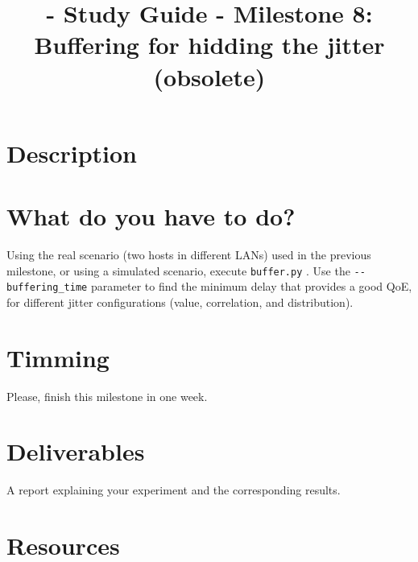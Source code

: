 
\title{\TM{} - Study Guide - Milestone 8: Buffering for hidding the jitter (obsolete)}

\maketitle

\section{Description}


\section{What do you have to do?}

Using the real scenario (two hosts in different LANs) used in the
previous milestone, or using a simulated scenario, execute
\verb|buffer.py| . Use the \verb|--buffering_time| parameter to find
the minimum delay that provides a good QoE, for different jitter
configurations (value, correlation, and distribution).

\section{Timming}

Please, finish this milestone in one week.

\section{Deliverables}

A report explaining your experiment and the corresponding results.

\section{Resources}


